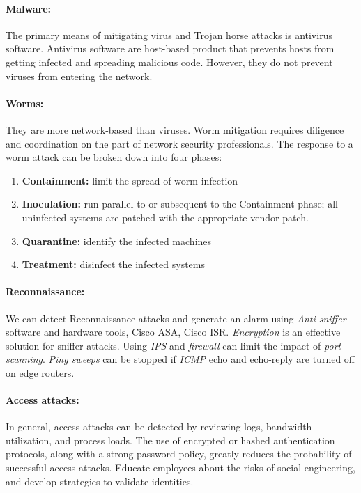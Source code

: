 \paragraph{Malware:} The primary means of mitigating virus and Trojan horse attacks is antivirus software. Antivirus software are host-based product that prevents hosts from getting infected and spreading malicious code. However, they do not prevent viruses from entering the network.

\paragraph{Worms:} They are more network-based than viruses. Worm mitigation requires diligence and coordination on the part of network security professionals. The response to a worm attack can be broken down into four phases:

\begin{enumerate}
\item \textbf{\textbf{Containment}:} limit the spread of worm infection
\item \textbf{Inoculation:} run parallel to or subsequent to the Containment phase; all uninfected systems are patched with the appropriate vendor patch.
\item \textbf{Quarantine:} identify the infected machines
\item \textbf{Treatment:} disinfect the infected systems
\end{enumerate}

\paragraph{Reconnaissance:} We can detect Reconnaissance attacks and generate an alarm using \emph{Anti-sniffer} software and hardware tools, Cisco ASA, Cisco ISR. \emph{Encryption} is an effective solution for sniffer attacks. Using \emph{IPS} and \emph{firewall} can limit the impact of \emph{port scanning}. \emph{Ping sweeps} can be stopped if \emph{ICMP} echo and echo-reply are turned off on edge routers. 

\paragraph{Access attacks:} In general, access attacks can be detected by reviewing logs, bandwidth utilization, and process loads. The use of encrypted or hashed authentication protocols, along with a strong password policy, greatly reduces the probability of successful access attacks. Educate employees about the risks of social engineering, and develop strategies to validate identities.


